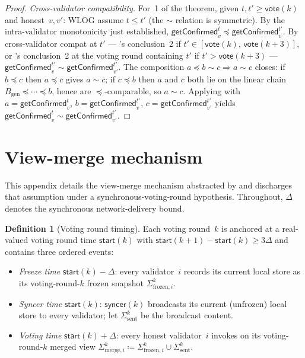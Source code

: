 \ifx\litemode\undefined\documentclass{article}\fi
\newcommand{\genesis}{\ensuremath{B_{\mathrm{gen}}}}
\newcommand{\start}{\ensuremath{\mathsf{start}}}
\newcommand{\vote}{\ensuremath{\mathsf{vote}}}
\newcommand{\syncer}{\textsf{syncer}\xspace}
\newcommand{\getConfirmed}{\textsf{getConfirmed}\xspace}
\theoremstyle{plain}
\theoremstyle{definition}
\newtheorem{definition}{Definition}
\theoremstyle{remark}
\begin{document}
\begin{proof}
\emph{Cross-validator compatibility.}
For~1 of the theorem, given $t, t' \geq \vote(k)$ and honest~$v, v'$: WLOG assume $t \leq t'$ (the $\sim$ relation is symmetric). By the intra-validator monotonicity just established, $\getConfirmed_v^{t} \preceq \getConfirmed_v^{t'}$. By cross-validator compat at $t'$ --- 's conclusion~2 if $t' \in [\vote(k),\, \vote(k+3)]$, or 's conclusion~2 at the voting round containing $t'$ if $t' > \vote(k+3)$ --- $\getConfirmed_v^{t'} \sim \getConfirmed_{v'}^{t'}$.
The composition $a \preceq b \sim c \Rightarrow a \sim c$ closes: if $b \preceq c$ then $a \preceq c$ gives $a \sim c$; if $c \preceq b$ then $a$ and $c$ both lie on the linear chain $\genesis \preceq \cdots \preceq b$, hence are $\preceq$-comparable, so $a \sim c$. Applying with $a = \getConfirmed_v^{t}$, $b = \getConfirmed_v^{t'}$, $c = \getConfirmed_{v'}^{t'}$ yields $\getConfirmed_v^{t} \sim \getConfirmed_{v'}^{t'}$.
\end{proof}

\appendix

\section{View-merge mechanism}\label{app:view-merge}

This appendix details the view-merge mechanism abstracted by  and discharges that assumption under a synchronous-voting-round hypothesis.
Throughout, $\Delta$ denotes the synchronous network-delivery bound.

\begin{definition}[Voting round timing]\label{def:slot-timing}
Each voting round~$k$ is anchored at a real-valued voting round time $\start(k)$ with $\start(k+1) - \start(k) \geq 3\Delta$ and contains three ordered events:
\begin{itemize}
  \item \emph{Freeze time} $\start(k) - \Delta$: every validator~$i$ records its current local store as its voting-round-$k$ frozen snapshot $\Sigma^k_{\mathrm{frozen},i}$.
  \item \emph{Syncer time} $\start(k)$: $\syncer(k)$ broadcasts its current (unfrozen) local store to every validator; let $\Sigma^k_{\mathrm{sent}}$ be the broadcast content.
  \item \emph{Voting time} $\start(k) + \Delta$: every honest validator~$i$ invokes  on its voting-round-$k$ merged view $\Sigma^k_{\mathrm{merge},i} \coloneqq \Sigma^k_{\mathrm{frozen},i} \cup \Sigma^k_{\mathrm{sent}}$.
\end{itemize}
\end{definition}
\end{document}

